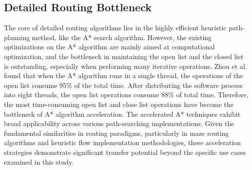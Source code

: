 \subsection{Detailed Routing Bottleneck}

The core of detailed routing algorithms lies in the highly efficient heuristic path-planning method, like the A* search algorithm. 
However, the existing optimizations on the A* algorithm are mainly aimed at computational optimization, 
and the bottleneck in maintaining the open list and the closed list is outstanding, especially when performing many iterative operations. 
Zhou et al.\cite{FP2020} found that when the A* algorithm runs in a single thread, the operations of the open list consume 95\% of the total time. 
After distributing the software process into eight threads, the open list operations consume 88\% of total time. 
Therefore, the most time-consuming open list and close list operations have become the bottleneck of A* algorithm acceleration. 
The accelerated A* techniques exhibit broad applicability across various path-searching implementations. 
Given the fundamental similarities in routing paradigms, particularly in maze routing algorithms and heuristic flow implementation methodologies, 
these acceleration strategies demonstrate significant transfer potential beyond the specific use cases examined in this study. 




